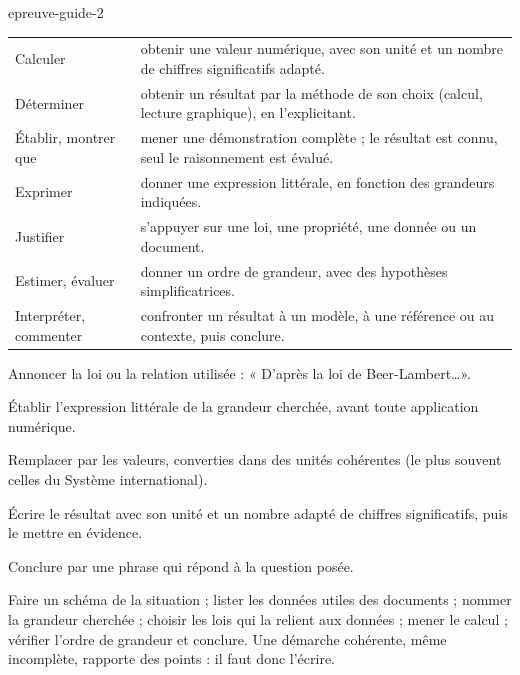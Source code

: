 \begin{blocEdition}{epreuve-guide-2}
\fontsize{10}{13.5}\selectfont
{}
\begin{tabularx}{\linewidth}{@{}p{38mm}Y@{}}\toprule
Calculer & obtenir une valeur numérique, avec son unité et un nombre de chiffres significatifs adapté. \\
Déterminer & obtenir un résultat par la méthode de son choix (calcul, lecture graphique), en l'explicitant. \\
Établir, montrer que & mener une démonstration complète ; le résultat est connu, seul le raisonnement est évalué. \\
Exprimer & donner une expression littérale, en fonction des grandeurs indiquées. \\
Justifier & s'appuyer sur une loi, une propriété, une donnée ou un document. \\
Estimer, évaluer & donner un ordre de grandeur, avec des hypothèses simplificatrices. \\
Interpréter, commenter & confronter un résultat à un modèle, à une référence ou au contexte, puis conclure. \\\bottomrule
\end{tabularx}
\begin{questions}
\item Annoncer la loi ou la relation utilisée : « D'après la loi de Beer-Lambert\ldots ».
\item Établir l'expression littérale de la grandeur cherchée, avant toute application numérique.
\item Remplacer par les valeurs, converties dans des unités cohérentes (le plus souvent celles du Système international).
\item Écrire le résultat avec son unité et un nombre adapté de chiffres significatifs, puis le mettre en évidence.
\item Conclure par une phrase qui répond à la question posée.
\end{questions}
Faire un schéma de la situation ; lister les données utiles des documents ; nommer la grandeur cherchée ; choisir les lois
qui la relient aux données ; mener le calcul ; vérifier l'ordre de grandeur et conclure. Une démarche cohérente, même
incomplète, rapporte des points : il faut donc l'écrire.
\end{blocEdition}

